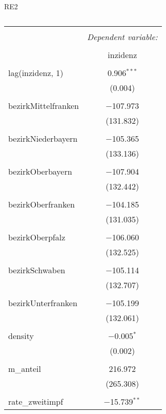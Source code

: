 \documentclass{article}
\begin{document}
RE2

\begin{table}[!htbp] \centering 
  \caption{} 
  \label{} 
\begin{tabular}{@{\extracolsep{5pt}}lc} 
\\[-1.8ex]\hline 
\hline \\[-1.8ex] 
 & \multicolumn{1}{c}{\textit{Dependent variable:}} \\ 
\cline{2-2} 
\\[-1.8ex] & inzidenz \\ 
\hline \\[-1.8ex] 
 lag(inzidenz, 1) & 0.906$^{***}$ \\ 
  & (0.004) \\ 
  & \\ 
 bezirkMittelfranken & $-$107.973 \\ 
  & (131.832) \\ 
  & \\ 
 bezirkNiederbayern & $-$105.365 \\ 
  & (133.136) \\ 
  & \\ 
 bezirkOberbayern & $-$107.904 \\ 
  & (132.442) \\ 
  & \\ 
 bezirkOberfranken & $-$104.185 \\ 
  & (131.035) \\ 
  & \\ 
 bezirkOberpfalz & $-$106.060 \\ 
  & (132.525) \\ 
  & \\ 
 bezirkSchwaben & $-$105.114 \\ 
  & (132.707) \\ 
  & \\ 
 bezirkUnterfranken & $-$105.199 \\ 
  & (132.061) \\ 
  & \\ 
 density & $-$0.005$^{*}$ \\ 
  & (0.002) \\ 
  & \\ 
 m\_anteil & 216.972 \\ 
  & (265.308) \\ 
  & \\ 
 rate\_zweitimpf & $-$15.739$^{**}$ \\ 

\end{tabular}
\end{table}
\end{document}
